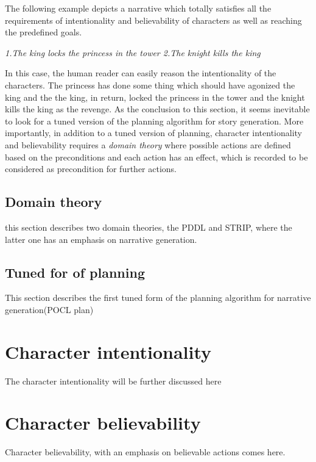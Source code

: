 \documentclass[english]{tktltiki}
\begin{document}
The following example depicts a narrative which totally satisfies all the requirements of intentionality and believability of characters as well as reaching the predefined goals.
\begin{flushleft}
\textit{1.The king locks the princess in the tower \newline 2.The knight kills the king}
\end{flushleft} 
In this case, the human reader can easily reason the intentionality of the characters. The princess has done some thing which should have agonized the king and the the king, in return, locked the princess in the tower and the knight kills the king as the revenge.
As the conclusion to this section, it seems inevitable to look for a tuned version of the planning algorithm for story generation. More importantly, in addition to a tuned version of planning, character intentionality and believability requires a \textit{domain theory} where possible actions are defined based on the preconditions and each action has an effect, which is recorded to be considered as precondition for further actions.
\subsection{Domain theory}
this section describes two domain theories, the PDDL and STRIP, where the latter one has an emphasis on narrative generation.  
\subsection{Tuned for of planning}
This section describes the first tuned form of the planning algorithm for narrative generation(POCL plan) 
\section{Character intentionality}
The character intentionality will be further discussed here
\section{Character believability}
Character believability, with an emphasis on believable actions comes here.
\end{document}
